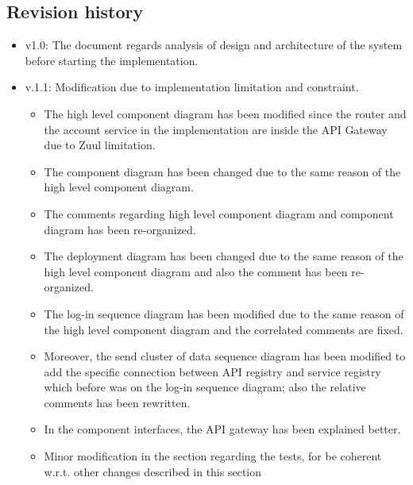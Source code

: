 \subsection{Revision history}
\begin{itemize}
\item v1.0: The document regards analysis of design and architecture of the system before starting the implementation.
\item v.1.1: Modification due to implementation limitation and constraint.
\begin{itemize}
	\item The high level component diagram has been modified since the router and the account service in the implementation are inside the API Gateway due to Zuul limitation.
	\item The component diagram has been changed due to the same reason of the high level component diagram.
	\item The comments regarding high level component diagram and component diagram has been re-organized.
	\item The deployment diagram has been changed due to the same reason of the high level component diagram and also the comment has been re-organized. 
	\item The log-in sequence diagram has been modified due to the same reason of the high level component diagram and the correlated comments are fixed. 
	\item Moreover, the send cluster of data sequence diagram has been modified to add the specific connection between API registry and service registry which before was on the log-in sequence diagram; also the relative comments has been rewritten.
	\item In the component interfaces, the API gateway has been explained better.
	\item Minor modification in the section regarding the tests, for be coherent w.r.t. other changes described in this section
\end{itemize}
\end{itemize}